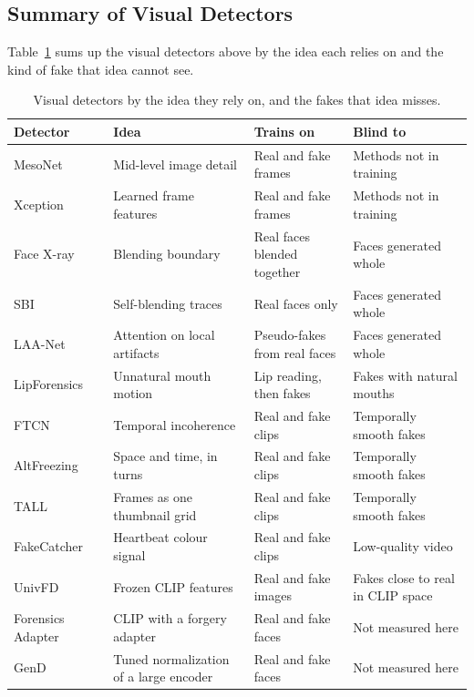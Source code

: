 \subsection{Summary of Visual Detectors}

Table~\ref{tab:visual} sums up the visual detectors above by the idea each
relies on and the kind of fake that idea cannot see.

\begin{table}[ht]
    \centering
    \small
    \caption{Visual detectors by the idea they rely on, and the fakes that idea misses.}
    \label{tab:visual}
    \begin{tabularx}{\textwidth}{@{}l >{\raggedright\arraybackslash}X >{\raggedright\arraybackslash}X >{\raggedright\arraybackslash}X@{}}
        \toprule
        \textbf{Detector} & \textbf{Idea} & \textbf{Trains on} & \textbf{Blind to} \\
        \midrule
        MesoNet~\cite{mesonet} & Mid-level image detail & Real and fake frames & Methods not in training \\
        Xception~\cite{ffpp,xception} & Learned frame features & Real and fake frames & Methods not in training \\
        Face X-ray~\cite{facexray} & Blending boundary & Real faces blended together & Faces generated whole \\
        SBI~\cite{sbi} & Self-blending traces & Real faces only & Faces generated whole \\
        LAA-Net~\cite{laanet} & Attention on local artifacts & Pseudo-fakes from real faces & Faces generated whole \\
        LipForensics~\cite{lipforensics} & Unnatural mouth motion & Lip reading, then fakes & Fakes with natural mouths \\
        FTCN~\cite{ftcn} & Temporal incoherence & Real and fake clips & Temporally smooth fakes \\
        AltFreezing~\cite{altfreezing} & Space and time, in turns & Real and fake clips & Temporally smooth fakes \\
        TALL~\cite{tall} & Frames as one thumbnail grid & Real and fake clips & Temporally smooth fakes \\
        FakeCatcher~\cite{fakecatcher} & Heartbeat colour signal & Real and fake clips & Low-quality video \\
        UnivFD~\cite{univfd} & Frozen CLIP features & Real and fake images & Fakes close to real in CLIP space \\
        Forensics Adapter~\cite{forensicsadapter} & CLIP with a forgery adapter & Real and fake faces & Not measured here \\
        GenD~\cite{gend} & Tuned normalization of a large encoder & Real and fake faces & Not measured here \\
        \bottomrule
    \end{tabularx}
\end{table}

